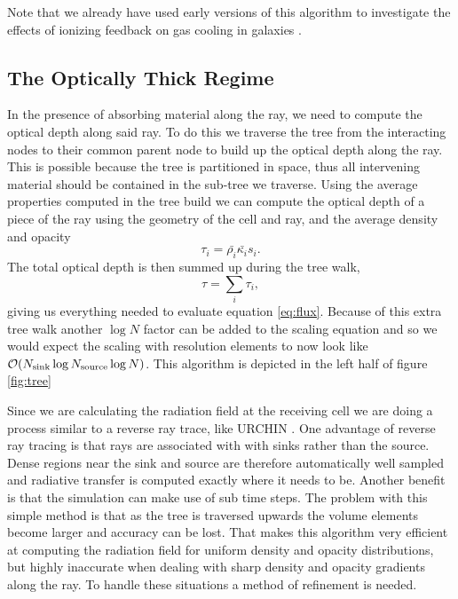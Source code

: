 \documentclass[fleqn,usenatbib]{mnras}
\begin{document}
Note that we already have used early versions of this algorithm to
 investigate the effects of ionizing feedback on gas cooling in galaxies
\citep{kannanEt14}.

\subsection{The Optically Thick Regime}
In the presence of absorbing material along the ray, we need to compute the 
optical depth along said ray. To do this we traverse the tree from the 
interacting nodes to their common parent node to build up the optical depth 
along the ray. This is possible because the tree is partitioned in space, thus
all intervening material should be contained in the sub-tree we traverse. Using
the average properties computed in the tree build we can compute the optical 
depth of a piece of the ray using the geometry of the cell and ray, and the 
average density and opacity
\begin{equation}
\label{eq:taui}
\tau_i = \bar{\rho_i} \bar{\kappa_i} s_i.
\end{equation}
The total optical depth is then summed up during the tree walk,
\begin{equation}
\label{eq:tausum}
\tau = \sum_i \tau_i,
\end{equation}
giving us everything needed to evaluate equation \ref{eq:flux}. Because of this
 extra tree walk another $\log N$ factor can be added to the scaling equation 
and so we would expect the scaling with resolution elements to now look like
$\mathcal{O} (N_{\rm sink} \log N_{\rm source} \log N)$. This algorithm is 
depicted in the left half of figure \ref{fig:tree}

Since we are calculating the radiation field at the receiving cell we are doing
 a process similar to a reverse ray trace, like URCHIN \citep{altayTheuns13}. 
One advantage of reverse ray tracing is that rays are associated with with 
sinks rather than the source. Dense regions near the sink and source are 
therefore automatically well sampled and radiative transfer is computed 
exactly where it needs to be. Another benefit is that the simulation can make 
use of sub time steps. The problem with this simple method is that as the 
tree is traversed upwards the volume elements become larger and accuracy can be
 lost. That makes this algorithm very efficient at computing the radiation 
field for uniform density and opacity distributions, but highly inaccurate when
 dealing with sharp density and opacity gradients along the ray. To handle 
these situations a method of refinement is needed.
\end{document}
